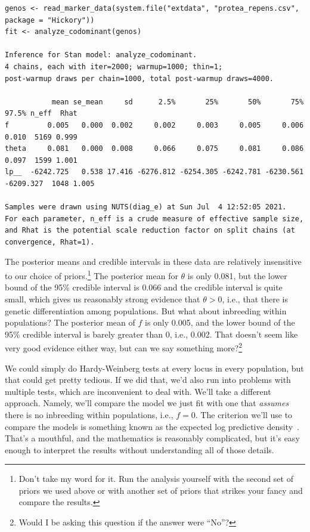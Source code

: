 \documentclass[12pt]{article}
\begin{document}
{\small
\begin{verbatim}
genos <- read_marker_data(system.file("extdata", "protea_repens.csv", package = "Hickory"))
fit <- analyze_codominant(genos)

Inference for Stan model: analyze_codominant.
4 chains, each with iter=2000; warmup=1000; thin=1; 
post-warmup draws per chain=1000, total post-warmup draws=4000.

           mean se_mean     sd      2.5%       25%       50%       75%     97.5% n_eff  Rhat
f         0.005   0.000  0.002     0.002     0.003     0.005     0.006     0.010  5169 0.999
theta     0.081   0.000  0.008     0.066     0.075     0.081     0.086     0.097  1599 1.001
lp__  -6242.725   0.538 17.416 -6276.812 -6254.305 -6242.781 -6230.561 -6209.327  1048 1.005

Samples were drawn using NUTS(diag_e) at Sun Jul  4 12:52:05 2021.
For each parameter, n_eff is a crude measure of effective sample size,
and Rhat is the potential scale reduction factor on split chains (at 
convergence, Rhat=1).
\end{verbatim}
}

The posterior means and credible intervals in these data are
relatively insensitive to our choice of priors.\footnote{Don't take my
  word for it. Run the analysis yourself with the second set of priors
  we used above or with another set of priors that strikes your fancy
  and compare the results.} The posterior mean for $\theta$ is only
0.081, but the lower bound of the 95\% credible interval is 0.066 and
the credible interval is quite small, which gives us reasonably strong
evidence that $\theta > 0$, i.e., that there is genetic
differentiation among populations. But what about inbreeding within
populations? The posterior mean of $f$ is only 0.005, and the lower
bound of the 95\% credible interval is barely greater than 0, i.e.,
0.002. That doesn't seem like very good evidence either way, but can
we say something more?\footnote{Would I be asking this question if the
  answer were ``No''?}

We could simply do Hardy-Weinberg tests at every locus in every
population, but that could get pretty tedious. If we did that, we'd
also run into problems with multiple tests, which are inconvenient to
deal with. We'll take a different approach. Namely, we'll compare the
model we just fit with one that {\it assumes\/} there is no inbreeding
within populations, i.e., $f = 0$. The criterion we'll use to compare
the models is something known as the expected log predictive
density~\cite{Vehtari-etal-2017}. That's a mouthful, and the
mathematics is reasonably complicated, but it's easy enough to
interpret the results without understanding all of those details.
\end{document}
